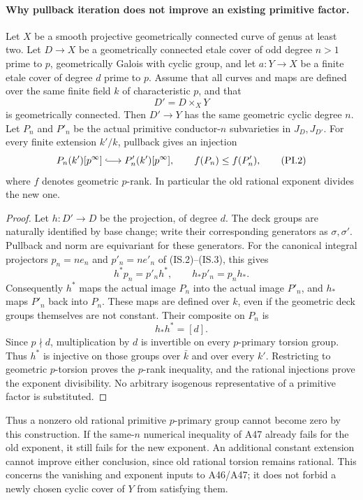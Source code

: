 \documentclass[11pt,a4paper]{article}
\begin{document}
\paragraph{Why pullback iteration does not improve an existing primitive factor.}
Let $X$ be a smooth projective geometrically connected curve
of genus at least two. Let $D\to X$ be a geometrically connected
etale cover of odd degree $n>1$ prime to $p$, geometrically
Galois with cyclic group, and let $a:Y\to X$ be a finite etale
cover of degree $d$ prime to $p$.
Assume that all curves and maps are defined over the same finite
field $k$ of characteristic $p$, and that
\[
                         D'=D\times_XY
 \tag{PI.1}
\]
is geometrically connected. Then $D'\to Y$ has the same
geometric cyclic degree $n$. Let $P_n$ and $P'_n$ be the
actual primitive conductor-$n$ subvarieties in $J_D,J_{D'}$.
For every finite extension $k'/k$, pullback gives an injection
\[
             P_n(k')[p^\infty]\lhook\joinrel\longrightarrow
                              P'_n(k')[p^\infty],
 \qquad
             f(P_n)\le f(P'_n),
 \tag{PI.2}
\]
where $f$ denotes geometric $p$-rank. In particular the old
rational exponent divides the new one.

\begin{proof}
Let $h:D'\to D$ be the projection, of degree $d$.
The deck groups are naturally identified by base change;
write their corresponding generators as $\sigma,\sigma'$.
Pullback and norm are equivariant for these generators.
For the canonical integral projectors $p_n=ne_n$ and
$p'_n=ne'_n$ of (IS.2)--(IS.3), this gives
\[
 h^*p_n=p'_nh^*,\qquad h_*p'_n=p_nh_*.
 \tag{PI.3}
\]
Consequently $h^*$ maps the actual image $P_n$ into the actual
image $P'_n$, and $h_*$ maps $P'_n$ back into $P_n$.
These maps are defined over $k$, even if the geometric deck
groups themselves are not constant. Their composite on $P_n$ is
\[
                          h_*h^*=[d].
 \tag{PI.4}
\]
Since $p\nmid d$, multiplication by $d$ is invertible on every
$p$-primary torsion group. Thus $h^*$ is injective on those
groups over $\bar k$ and over every $k'$. Restricting to
geometric $p$-torsion proves the $p$-rank inequality, and
the rational injections prove the exponent divisibility.
No arbitrary isogenous representative of a primitive factor
is substituted.
\end{proof}

Thus a nonzero old rational primitive $p$-primary group cannot
become zero by this construction. If the same-$n$ numerical
inequality of A47 already fails for the old exponent, it still
fails for the new exponent. An additional constant extension
cannot improve either conclusion, since old rational torsion
remains rational. This concerns the vanishing and exponent
inputs to A46/A47; it does not forbid a newly chosen cyclic
cover of $Y$ from satisfying them.
\end{document}
